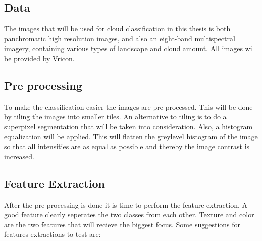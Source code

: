 \documentclass{article}
\begin{document}
\subsection{Data}
The images that will be used for cloud classification in this thesis is both panchromatic high resolution images, and also an eight-band multispectral imagery, containing various types of landscape and cloud amount. All images will be provided by Vricon.

\subsection{Pre processing}
To make the classification easier the images are pre processed. This will be done by tiling the images into smaller tiles. An alternative to tiling is to do a superpixel segmentation that will be taken into consideration. Also, a histogram equalization will be applied. This will flatten the greylevel histogram of the image so that all intensities are as equal as possible and thereby the image contrast is increased.




\subsection{Feature Extraction}
After the pre processing is done it is time to perform the feature extraction. A good feature clearly seperates the two classes from each other. Texture and color are the two features that will recieve the biggest focus. Some suggestions for features extractions to test are:
\end{document}
